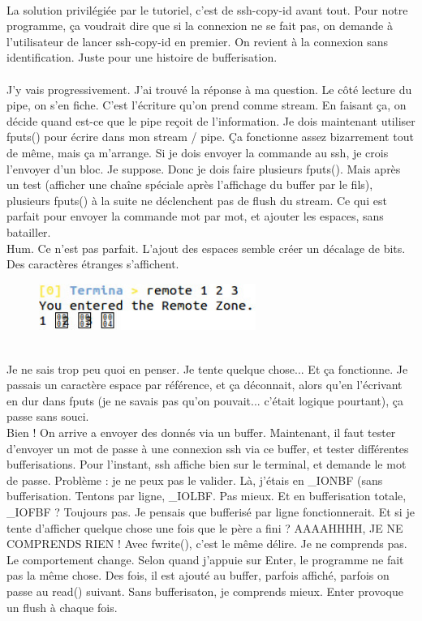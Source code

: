 \\La solution privilégiée par le tutoriel, c'est de ssh-copy-id avant tout. Pour notre programme, ça voudrait dire que si la connexion ne se fait pas, on demande à l'utilisateur de lancer ssh-copy-id en premier. On revient à la connexion sans identification. Juste pour une histoire de bufferisation.
\\\\
J'y vais progressivement. J'ai trouvé la réponse à ma question. Le côté lecture du pipe, on s'en fiche. C'est l'écriture qu'on prend comme stream. En faisant ça, on décide quand est-ce que le pipe reçoit de l'information. Je dois maintenant utiliser fputs() pour écrire dans mon stream / pipe. Ça fonctionne assez bizarrement tout de même, mais ça m'arrange. Si je dois envoyer la commande au ssh, je crois l'envoyer d'un bloc. Je suppose. Donc je dois faire plusieurs fputs(). Mais après un test (afficher une chaîne spéciale après l'affichage du buffer par le fils), plusieurs fputs() à la suite ne déclenchent pas de flush du stream. Ce qui est parfait pour envoyer la commande mot par mot, et ajouter les espaces, sans batailler.
\\Hum. Ce n'est pas parfait. L'ajout des espaces semble créer un décalage de bits. Des caractères étranges s'affichent.
\begin{figure}[!htp]
\centering
\includegraphics[width=200pt]{Axel-06_RemoteChars.jpg}
\end{figure}
\\Je ne sais trop peu quoi en penser. Je tente quelque chose... Et ça fonctionne. Je passais un caractère espace par référence, et ça déconnait, alors qu'en l'écrivant en dur dans fputs (je ne savais pas qu'on pouvait... c'était logique pourtant), ça passe sans souci.
\\Bien ! On arrive a envoyer des donnés via un buffer. Maintenant, il faut tester d'envoyer un mot de passe à une connexion ssh via ce buffer, et tester différentes bufferisations. Pour l'instant, ssh affiche bien sur le terminal, et demande le mot de passe. Problème : je ne peux pas le valider. Là, j'étais en \_IONBF (sans bufferisation. Tentons par ligne, \_IOLBF. Pas mieux. Et en bufferisation totale, \_IOFBF ? Toujours pas. Je pensais que bufferisé par ligne fonctionnerait. Et si je tente d'afficher quelque chose une fois que le père a fini ? AAAAHHHH, JE NE COMPRENDS RIEN ! Avec fwrite(), c'est le même délire. Je ne comprends pas. Le comportement change. Selon quand j'appuie sur Enter, le programme ne fait pas la même chose. Des fois, il est ajouté au buffer, parfois affiché, parfois on passe au read() suivant. Sans bufferisaton, je comprends mieux. Enter provoque un flush à chaque fois.

